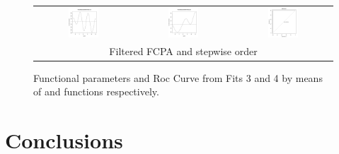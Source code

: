 \begin{figure}
\begin{center}
\begin{tabular}{ccc}
\includegraphics[width=0.33\textwidth]{Graphs/Fit4FunParam1.png} & \includegraphics[width=0.33\textwidth]{Graphs/Fit4FunParam2.png} & \includegraphics[width=0.33\textwidth]{Graphs/Fit4ROC.png}\\
\multicolumn{3}{c}{Filtered FCPA and stepwise order}\\
\end{tabular}
\end{center}
\caption{Functional parameters and Roc Curve from Fits 3 and 4 by means of  and  functions respectively.}
\label{Fit34}
\end{figure}

\section{Conclusions}

